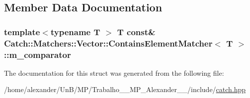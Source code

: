 \subsection{Member Data Documentation}
\hypertarget{structCatch_1_1Matchers_1_1Vector_1_1ContainsElementMatcher_ab7eada6c4bbce1d21b44773262f9cb23}{
\subsubsection[{m\-\_\-comparator}]{\setlength{\rightskip}{0pt plus 5cm}template$<$typename T $>$ T const\& {\bf Catch\-::\-Matchers\-::\-Vector\-::\-Contains\-Element\-Matcher}$<$ T $>$\-::m\-\_\-comparator}}\label{structCatch_1_1Matchers_1_1Vector_1_1ContainsElementMatcher_ab7eada6c4bbce1d21b44773262f9cb23}


The documentation for this struct was generated from the following file\-:\begin{DoxyCompactItemize}
\item 
/home/alexander/\-Un\-B/\-M\-P/\-Trabalho\-\_\-\_\-\-M\-P\-\_\-\-Alexander\-\_\-\_/include/\hyperlink{catch_8hpp}{catch.\-hpp}\end{DoxyCompactItemize}
